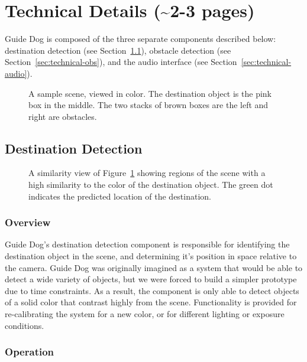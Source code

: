 \section{Technical Details (\textasciitilde 2-3 pages)}
\label{sec:technical}

Guide Dog is composed of the three separate components described below: destination detection
(see Section~\ref{sec:technical-dest}),
obstacle detection (see Section~\ref{sec:technical-obs}), and the audio
interface (see Section~\ref{sec:technical-audio}).

\begin{figure}
\caption{A sample scene, viewed in color. The destination object is the pink box
  in the middle. The two stacks of brown boxes are the left and right are
  obstacles.}
\label{fig:color}
\end{figure}

\subsection{Destination Detection}
\label{sec:technical-dest}

\begin{figure}
\caption{A similarity view of Figure~\ref{fig:color} showing regions of the scene with a high similarity
to the color of the destination object. The green dot indicates the predicted location of the destination.}
\label{fig:destination}
\end{figure}

\subsubsection{Overview}
\label{sec:technical-dest-overview}

Guide Dog's destination detection component is responsible for identifying the
destination object in the scene, and determining it's position in space 
relative to the camera. Guide Dog was originally imagined as a system that
would be able to detect a wide variety of objects, but we were forced to
build a simpler prototype due to time constraints. As a result, the component 
is only able to detect objects of a solid color that contrast highly from the 
scene. Functionality is provided for re-calibrating the system for a new color, 
or for different lighting or exposure conditions. 

\subsubsection{Operation}
\label{sec:technical-dest-op}

